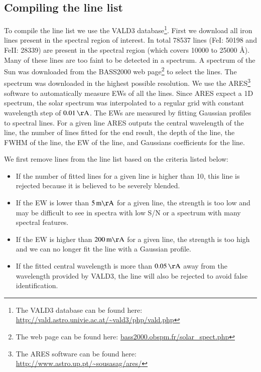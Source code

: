 \documentclass{aa}
\begin{document}
\subsection{Compiling the line list}

To compile the line list we use the VALD3
database\footnote{The VALD3 database can be found here:
\url{http://vald.astro.univie.ac.at/~vald3/php/vald.php}}.
First we download all iron lines present in the spectral
region of interest. In total 78537 lines (FeI: 50198 and
FeII: 28339) are present in the spectral region (which covers
10000 to 25000 \si{\angstrom}). Many of these lines are too faint
to be detected in a spectrum. A spectrum of the Sun was downloaded
from the BASS2000 web page\footnote{The web page can be found here:
\url{bass2000.obspm.fr/solar_spect.php}} to select the lines.
The spectrum was downloaded in the highest possible resolution.
We use the ARES\footnote{The ARES software can be found here:
\url{http://www.astro.up.pt/~sousasag/ares/}}\citep{Sousa2007,Sousa2015}
software to automatically measure EWs of all the lines. Since ARES
expect a 1D spectrum, the solar spectrum was interpolated to a regular
grid with constant wavelength step of $\SI{0.01}{\AA}$. The EWs are
measured by fitting Gaussian profiles to spectral lines. For a given
line ARES outputs the central wavelength of the line, the number of lines
fitted for the end result, the depth of the line, the FWHM of the line,
the EW of the line, and Gaussians coefficients for the line.

We first remove lines from the line list based on the criteria listed
below:
\begin{itemize}
    \item If the number of fitted lines for a given line is higher than 10,
        this line is rejected because it is believed to be severely blended.
    \item If the EW is lower than $\SI{5}{m\AA}$ for a given line, the strength
        is too low and may be difficult to see in spectra with low S/N or a
        spectrum with many spectral features.
    \item If the EW is higher than $\SI{200}{m\AA}$ for a given line, the strength
        is too high and we can no longer fit the line with a Gaussian profile.
    \item If the fitted central wavelength is more than $\SI{0.05}{\AA}$ away
        from the wavelength provided by VALD3, the line will also be rejected to
        avoid false identification.
\end{itemize}
\end{document}
